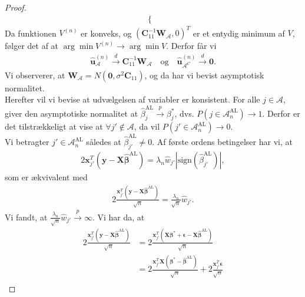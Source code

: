 \begin{proof}
\begin{align*}
\begin{cases}
  \end{cases}
\end{align*}
Da funktionen $V^{(n)}$ er konveks, og $(\mathbf{C}_{11}^{-1} \mathbf{W_\mathcal{A}},0)^T$ er et entydig minimum af $V$, følger det af \citep{adaptive_lasso} at 
$\arg\min V^{(n)} \rightarrow \arg\min V$.
Derfor får vi
\begin{align}
\hat{\mathbf{u}}_\mathcal{A}^{(n)} \overset{d}{\rightarrow} \mathbf{C}_{11}^{-1} \mathbf{W}_\mathcal{A} \quad \text{og} \quad \hat{\mathbf{u}}_{\mathcal{A}^C}^{(n)} \overset{d}{\rightarrow} \mathbf{0}. \label{eq:minUA}
\end{align}
Vi observerer, at $\mathbf{W}_\mathcal{A}=N(\mathbf{0}, \sigma^2 \mathbf{C}_{11})$, og da har vi bevist asymptotisk normalitet. \\

Herefter vil vi bevise at udvælgelsen af variabler er konsistent. For alle $j \in \mathcal{A}$, giver den asymptotiske normalitet at $\hat{\beta}_j^{\text{AL}} \overset{p}{\rightarrow}\beta_j^{*}$, dvs. $P(j \in \mathcal{A}_n^{\text{AL}}) \rightarrow 1$. Derfor er det tilstrækkeligt at vise at $\forall j' \notin \mathcal{A}$, da vil $P(j' \in \mathcal{A}_n^{\text{AL}}) \rightarrow 0$. \\
Vi betragter $j' \in \mathcal{A}_n^{\text{AL}}$ således at $\hat{\beta}_{j'}^{\text{AL}} \neq 0$. Af første ordens betingelser har vi, at 
\begin{align*}
2 \mathbf{x}_{j'}^T  \left( \mathbf{y}-\mathbf{X}\hat{\boldsymbol{\beta}}^{\text{AL}} \right)=\lambda_n \hat{w}_{j'} \left\vert \text{sign}(\hat{\beta}_{j'}^\text{AL}) \right\vert,
\end{align*}
som er ækvivalent med
\begin{align*}
2 \frac{\mathbf{x}_{j'}^T \left( \mathbf{y}-\mathbf{X}\hat{\boldsymbol{\beta}}^{{\text{AL}}}\right)}{\sqrt{n}}=\frac{\lambda_n}{\sqrt{n}} \hat{w}_{j'}.
\end{align*}
Vi fandt, at $\frac{\lambda_n}{\sqrt{n}} \hat{w}_{j'} \overset{p}{\rightarrow} \infty$. Vi har da, at 
\begin{align*}
2 \frac{\mathbf{x}_{j'}^T \left(\mathbf{y}-\mathbf{X}\hat{\boldsymbol{\beta}}^{{\text{AL}}} \right)}{\sqrt{n}}
 &= 2 \frac{\mathbf{x}_{j'}^T \left(\mathbf{X}\boldsymbol{\beta}^*+\boldsymbol{\epsilon}-\mathbf{X}\hat{\boldsymbol{\beta}}^{{\text{AL}}} \right) }{\sqrt{n}} \\
&= 2 \frac{\mathbf{x}_{j'}^T \mathbf{X} \left(\boldsymbol{\beta}^*-\hat{\boldsymbol{\beta}}^{\text{AL}} \right)}{\sqrt{n}}+2\frac{\mathbf{x}_{j'}^T \boldsymbol{\epsilon}}{\sqrt{n}} \\

\end{align*}
\end{proof}
